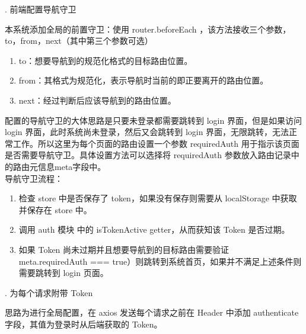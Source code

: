 . 前端配置导航守卫

本系统添加全局的前置守卫：使用  router.beforeEach ，该方法接收三个参数，to，from，next（其中第三个参数可选）
\begin{enumerate}
  \item to：想要导航到的规范化格式的目标路由位置。
  \item from：其格式为规范化，表示导航时当前的即正要离开的路由位置。
  \item next：经过判断后应该导航到的路由位置。
\end{enumerate}
配置的导航守卫的大体思路是只要未登录都需要跳转到 login 界面，但是如果访问 login 界面，此时系统尚未登录，然后又会跳转到 login 界面，无限跳转，无法正常工作。所以这里为每个页面的路由设置一个参数 requiredAuth 用于指示该页面是否需要导航守卫。具体设置方法可以选择将 requiredAuth 参数放入路由记录中的路由元信息meta字段中。\\
导航守卫流程：
\begin{enumerate}
  \item 检查 store 中是否保存了 token，如果没有保存则需要从 localStorage 中获取并保存在 store 中。
  \item 调用 auth 模块 中的 isTokenActive getter，从而获知该 Token 是否过期。
  \item 如果 Token 尚未过期并且想要导航到的目标路由需要验证\\meta.requiredAuth === true）则跳转到系统首页，如果并不满足上述条件则需要跳转到 login 页面。
\end{enumerate}

. 为每个请求附带 Token

思路为进行全局配置，在 axios 发送每个请求之前在 Header 中添加 authenticate 字段，其值为登录时从后端获取的 Token。

